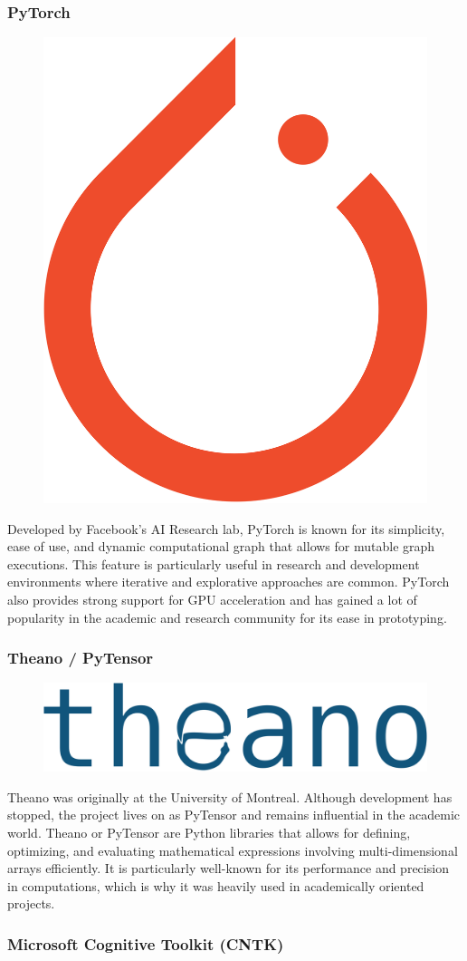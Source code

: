 \subsubsection*{PyTorch}

\begin{figure}
\begin{center}
\includegraphics[width=.75in]{pytorch_logo.png}
\end{center}
\end{figure}
Developed by Facebook's AI Research lab, PyTorch is known for its simplicity, ease of use, and dynamic computational graph that allows for mutable graph executions. This feature is particularly useful in research and development environments where iterative and explorative approaches are common. PyTorch also provides strong support for GPU acceleration and has gained a lot of popularity in the academic and research community for its ease in prototyping.

\subsubsection*{Theano / PyTensor}

\begin{figure}
\begin{center}
\includegraphics[width=.75in]{theano_logo.png}
\end{center}
\end{figure}

Theano was originally at the University of Montreal. Although development has stopped, the project lives on as PyTensor and remains influential in the academic world. Theano or PyTensor are Python libraries that allows for defining, optimizing, and evaluating mathematical expressions involving multi-dimensional arrays efficiently. It is particularly well-known for its performance and precision in computations, which is why it was heavily used in academically oriented projects.

\subsubsection*{Microsoft Cognitive Toolkit (CNTK)}

